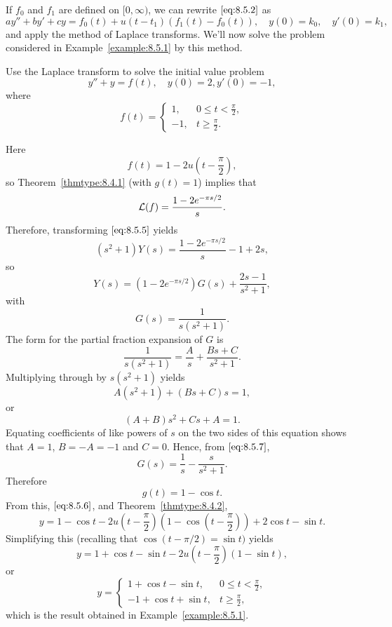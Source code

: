 \documentclass{ximera}
\begin{document}
If $f_0$ and $f_1$ are defined on $[0,\infty)$, we can rewrite
$\eqref{eq:8.5.2}$ as
$$
ay''+by'+cy=f_0(t)+u(t-t_1)\left(f_1(t)-f_0(t)\right), \quad  y(0)=k_0,\quad y'(0)=k_1,
$$
and apply the method of Laplace transforms. We'll now solve
the problem considered in Example~\ref{example:8.5.1} by this method.

\begin{example}\label{example:8.5.2}
\space Use the Laplace transform to solve the initial value problem
\begin{equation}\label{eq:8.5.5}
y''+y=f(t), \quad   y(0)=2,  y'(0)=-1,
\end{equation}
where
$$
f(t)=\left\{\begin{array}{cl}
1,&0\leq t<\frac{\pi}{2},\\
-1,&t\geq\frac{\pi}{2}.
\end{array}\right.
$$

\begin{explanation} Here
$$
f(t)=1-2u\left(t-\frac{\pi}{2}\right),
$$
so Theorem~\ref{thmtype:8.4.1} (with $g(t)=1$) implies that
$$
{\cal L}(f)=\frac{1-2e^{-{\pi s/2}}}{s}.
$$
Therefore, transforming  $\eqref{eq:8.5.5}$ yields
$$
(s^2+1)Y(s)=\frac{1-2e^{-{\pi s/ 2}}}{s}-1+2s,
$$
 so
\begin{equation}\label{eq:8.5.6}
Y(s)=(1-2e^{-{\pi s/ 2}}) G(s)+\frac{2s-1}{s^2+1},
\end{equation}
with
$$
G(s)=\frac{1}{s(s^2+1)}.
$$
The form for the partial fraction expansion of $G$ is
\begin{equation}\label{eq:8.5.7}
\frac{1}{s(s^2+1)}=\frac{A}{s}+\frac{Bs+C}{s^2+1}.
\end{equation}
Multiplying through by $s(s^2+1)$ yields
$$
A(s^2+1)+(Bs+C)s=1,
$$
or
$$
(A+B)s^2+Cs+A=1.
$$
Equating coefficients of like powers of $s$ on the two sides of this
equation shows that $A=1$, $B=-A=-1$ and $C=0$. Hence, from
$\eqref{eq:8.5.7}$,
$$
G(s)=\frac{1}{s}-\frac{s}{s^2+1}.
$$
Therefore
$$
g(t)=1-\cos t.
$$
From this, $\eqref{eq:8.5.6}$, and
Theorem~\ref{thmtype:8.4.2},
$$
y=1-\cos t-2u\left(t-\frac{\pi}{2}\right)\left(1-\cos\left(t-\frac{\pi}{2}\right)\right)+2\cos t-\sin t.
$$
Simplifying this (recalling that $\cos (t-\pi/2)=\sin t)$ yields
$$
y=1+\cos t-\sin t-2u\left(t-\frac{\pi}{2}\right)(1-\sin t),
$$
or
$$
y=\left\{\begin{array}{cl}
1+\cos t-\sin t,&0\leq t<\frac{\pi}{2},\\
-1+\cos t+\sin t,&t\geq \frac{\pi}{2},
\end{array}\right.
$$
which is the result obtained in Example~\ref{example:8.5.1}.
\end{explanation}
\end{example}
\end{document}
